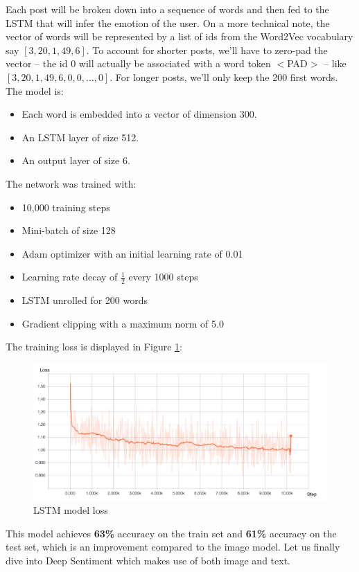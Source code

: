 Each post will be broken down into a sequence of words and then fed to the LSTM that will infer the emotion of the user. On a more technical note, the vector of words will be represented by a list of ids from the Word2Vec vocabulary say $[3, 20, 1, 49, 6]$. To account for shorter posts, we'll have to zero-pad the vector -- the id 0 will actually be associated with a word token $<$PAD$>$ -- like $[3, 20, 1, 49, 6, 0, 0, ..., 0]$. For longer posts, we'll only keep the 200 first words. The model is:
\begin{itemize}
    \item Each word is embedded into a vector of dimension 300.
    \item An LSTM layer of size 512.
    \item An output layer of size 6.
\end{itemize}

The network was trained with:
\begin{itemize}[topsep=0pt]
    \itemsep-1em
    \item 10,000 training steps
    \item Mini-batch of size 128
    \item Adam optimizer with an initial learning rate of 0.01
    \item Learning rate decay of $\frac{1}{2}$ every 1000 steps
    \item LSTM unrolled for 200 words
    \item Gradient clipping with a maximum norm of 5.0
\end{itemize}

The training loss is displayed in Figure \ref{text-loss}:

\begin{figure}[H]
    \centering
    \includegraphics[width=\textwidth]{Images/text_loss_cleaned.jpg}
    \caption{LSTM model loss}
    \label{text-loss}
\end{figure}

This model achieves \textbf{63\%} accuracy on the train set and \textbf{61\%} accuracy on the test set, which is an improvement compared to the image model. Let us finally dive into Deep Sentiment which makes use of both image and text.







